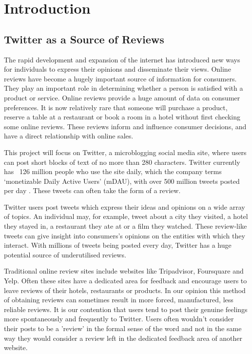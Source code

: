 
\chapter{Introduction}

\section{Twitter as a Source of Reviews}
The rapid development and expansion of the internet has introduced new ways for individuals to express their opinions and disseminate their views. Online reviews have become a hugely important source of information for consumers. They play an important role in determining whether a person is satisfied with a product or service. Online reviews provide a huge amount of data on consumer preferences. It is now relatively rare that someone will purchase a product, reserve a table at a restaurant or book a room in a hotel without first checking some online reviews. These reviews inform and influence consumer decisions, and have a direct relationship with online sales. 

This project will focus on Twitter, a microblogging social media site, where users can post short blocks of text of no more than 280 characters. Twitter currently has ~126 million people who use the site daily, which the company terms `monetizable Daily Active Users' (mDAU), with over 500 million tweets posted per day \cite{Twitter2019}. These tweets can often take the form of a review.

Twitter users post tweets which express their ideas and opinions on a wide array of topics. An individual may, for example, tweet about a city they visited, a hotel they stayed in, a restaurant they ate at or a film they watched. These review-like tweets can give insight into consumers’s opinions on the entities with which they interact. With millions of tweets being posted every day, Twitter has a huge potential source of underutilised reviews.

Traditional online review sites include websites like Tripadvisor, Foursquare and Yelp. Often these sites have a dedicated area for feedback and encourage users to leave reviews of their hotels, restaurants or products. In our opinion this method of obtaining reviews can sometimes result in more forced, manufactured, less reliable reviews. It is our contention that users tend to post their genuine feelings more spontaneously and frequently to Twitter. Users often wouldn't consider their posts to be a 'review' in the formal sense of the word and not in the same way they would consider a review left in the dedicated feedback area of another website.

